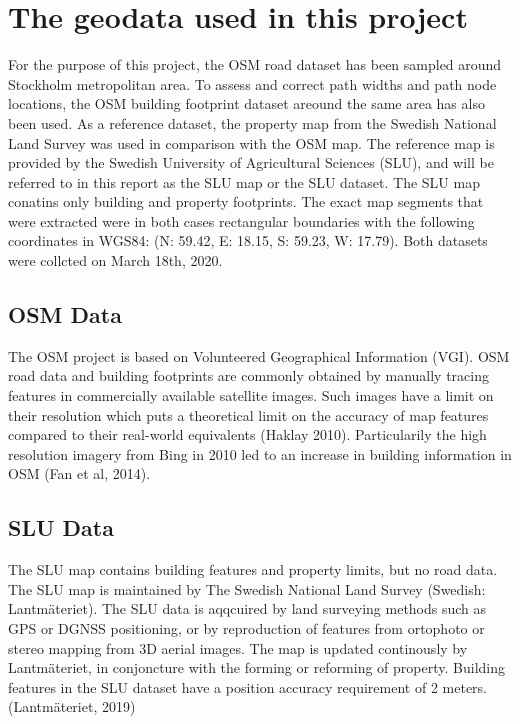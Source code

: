 \documentclass[a4paper]{article}
\begin{document}
\section{The geodata used in this project}

For the purpose of this project, the OSM road dataset has been sampled around Stockholm metropolitan area.
To assess and correct path widths and path node locations, the OSM building footprint dataset areound the same area has also been used.
As a reference dataset, the property map from the Swedish National Land Survey was used in comparison with the OSM map.
The reference map is provided by the Swedish University of Agricultural Sciences (SLU), and will be referred to in this report as the SLU map or the SLU dataset.
The SLU map conatins only building and property footprints.
The exact map segments that were extracted were in both cases rectangular boundaries with the following coordinates in WGS84: (N: 59.42, E: 18.15, S: 59.23, W: 17.79).
Both datasets were collcted on March 18th, 2020.

\subsection{OSM Data}

The OSM project is based on Volunteered Geographical Information (VGI).
OSM road data and building footprints are commonly obtained by manually tracing features in commercially available satellite images.
Such images have a limit on their resolution which puts a theoretical limit on the accuracy of map features compared to their real-world equivalents (Haklay 2010).
Particularily the high resolution imagery from Bing in 2010 led to an increase in building information in OSM (Fan et al, 2014).

\subsection{SLU Data}

The SLU map contains building features and property limits, but no road data.
The SLU map is maintained by The Swedish National Land Survey (Swedish: Lantmäteriet).
The SLU data is aqqcuired by land surveying methods such as GPS or DGNSS positioning, or by reproduction of features from ortophoto or stereo mapping from 3D aerial images.
The map is updated continously by Lantmäteriet, in conjoncture with the forming or reforming of property.
Building features in the SLU dataset have a position accuracy requirement of 2 meters.
(Lantmäteriet, 2019)
\end{document}
